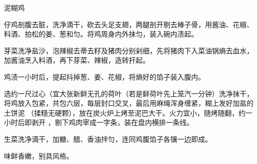 \begin{recipe}[叫化鸡]{泥糊鸡}

\ingredients



\preparation

\step 仔鸡剖腹去脏，洗净滴干，砍去头足支翅，两腿剖开剔去棒子骨，用酱油、花椒、
料酒、拍松的姜、葱和匀。将鸡周身内外抹匀，装入碗内渍起。

\step 芽菜洗净盐沙，泡辣椒去蒂去籽及猪肉分别剁细，先将猪肉下入菜油锅熵去血水，
加酱油烹入料酒，再下芽菜、辣椒，造转扞起。

\step 鸡渍一小时后，提起抖掉葱、姜、花椒，将熵好的馅子装入腹内。

\step 选约一尺过心（宜大张新鲜无孔的荷叶（若是鲜荷叶先上笼汽一分钟）洗净抹干，
将鸡放入包紧，共包六层，每层封口交叉，最后用麻绳浑身缠紧，糊上发好加盐的土饼泥
（揉糙无硬颗），放在炭火炉上烤至泥巴大干。火力宜小，随烤随翻，约一小时后即剥开
，剔下鸡肉宰成一字条，装在盘内横排一条线。

\step 生菜洗净滴干，加糖、醋、香油拌匀，连同鸡腹馅子各镶一边即成。

\features

味鲜香嫩，别具风格。

\end{recipe}

